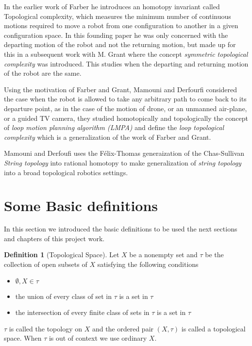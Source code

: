 \documentclass[a4paper, 12pt]{scrartcl}
\theoremstyle{definition}
\newtheorem{defn}{Definition}[section]
\begin{document}
    In the earlier work of Farber he introduces an homotopy invariant called Topological complexity, which measures the minimum number of continuous motions required to move a robot from one configuration to another in a given configuration space. In this founding paper he was only concerned with the departing motion of the robot and not the returning motion, but made up for this in a subsequent work with M. Grant where the concept \textit{symmetric topological complexity} was introduced. This studies when the departing and returning motion of the robot are the same.

    Using the motivation of Farber and Grant, Mamouni and Derfourfi considered the case when the robot is allowed to take any arbitrary path to come back to its departure point, as in the case of the motion of drone, or an unmanned air-plane, or a guided TV camera, they studied homotopically and topologically the concept of \textit{loop motion planning algorithm (LMPA)}  and define the \textit{loop topological complexity} which is a generalization of the work of Farber and Grant.
    
    Mamouni and Derfoufi uses the F\'elix-Thomas generaization of the Chas-Sullivan \textit{String topology} into rational homotopy to make generalization of \textit{string topology} into a broad topological robotics settings.

    \section{Some Basic definitions}
    In this section we introduced the basic definitions to be used the next sections and chapters of this project work.

    \begin{defn}[Topological Space]
        Let $X$ be a nonempty set and $\tau$ be the collection of open subsets of $X$ satisfying the following conditions
        \begin{itemize}
            \item[1.] $\emptyset, X \in \tau$
            \item[2.] the union of every class of set in $\tau$ is a set in $\tau$
            \item[3.] the intersection of every finite class of sets in $\tau$ is a set in $\tau$
        \end{itemize}
        $\tau$ is called the topology on $X$ and the ordered pair $(X, \tau)$ is called a topological space. When $\tau$ is out of context we use ordinary $X$.
    \end{defn}
\end{document}
